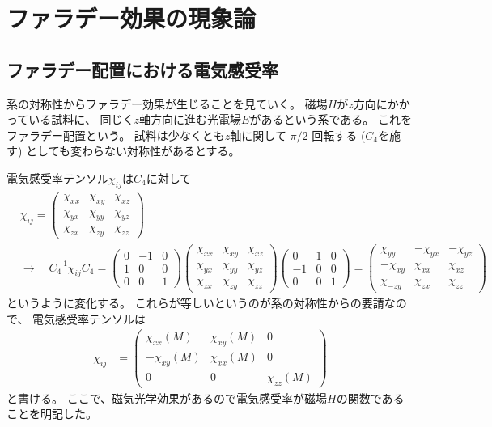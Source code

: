 \documentclass[9pt,dvipdfmx,a4paper]{jsarticle}
\begin{document}


\nocite{*}
\appendix
\section{ファラデー効果の現象論}
\subsection{ファラデー配置における電気感受率}
系の対称性からファラデー効果が生じることを見ていく。
磁場\(H\)が\(z\)方向にかかっている試料に、
同じく\(z\)軸方向に進む光電場\(E\)があるという系である。
これをファラデー配置という。
試料は少なくとも\(z\)軸に関して \(\pi/2\) 回転する (\(C_4\)を施す) としても変わらない対称性があるとする。

電気感受率テンソル\(\chi_{ij}\)は\(C_4\)に対して
\begin{align}
    &\chi_{ij}
    = \begin{pmatrix}
        \chi_{xx} & \chi_{xy} & \chi_{xz}\\
        \chi_{yx} & \chi_{yy} & \chi_{yz}\\
        \chi_{zx} & \chi_{zy} & \chi_{zz}
    \end{pmatrix}\\
    &\rightarrow\quad
    C_4^{-1}\chi_{ij}C_4
    = \begin{pmatrix}
        0 & -1 & 0\\
        1 & 0 & 0\\
        0 & 0 & 1
    \end{pmatrix}
    \begin{pmatrix}
        \chi_{xx} & \chi_{xy} & \chi_{xz}\\
        \chi_{yx} & \chi_{yy} & \chi_{yz}\\
        \chi_{zx} & \chi_{zy} & \chi_{zz}
    \end{pmatrix}
    \begin{pmatrix}
        0 & 1 & 0\\
        -1 & 0 & 0\\
        0 & 0 & 1
    \end{pmatrix}
    = \begin{pmatrix}
        \chi_{yy} & -\chi_{yx} & -\chi_{yz}\\
        -\chi_{xy} & \chi_{xx} & \chi_{xz}\\
        \chi_{-zy} & \chi_{zx} & \chi_{zz}
    \end{pmatrix}
\end{align}
というように変化する。
これらが等しいというのが系の対称性からの要請なので、
電気感受率テンソルは
\begin{align}
    \chi_{ij}
    &= \begin{pmatrix}
        \chi_{xx}(M) & \chi_{xy}(M) & 0\\
        -\chi_{xy}(M) & \chi_{xx}(M) & 0\\
        0 & 0 & \chi_{zz}(M)
    \end{pmatrix}
\end{align}
と書ける。
ここで、磁気光学効果があるので電気感受率が磁場\(H\)の関数であることを明記した。
\end{document}
